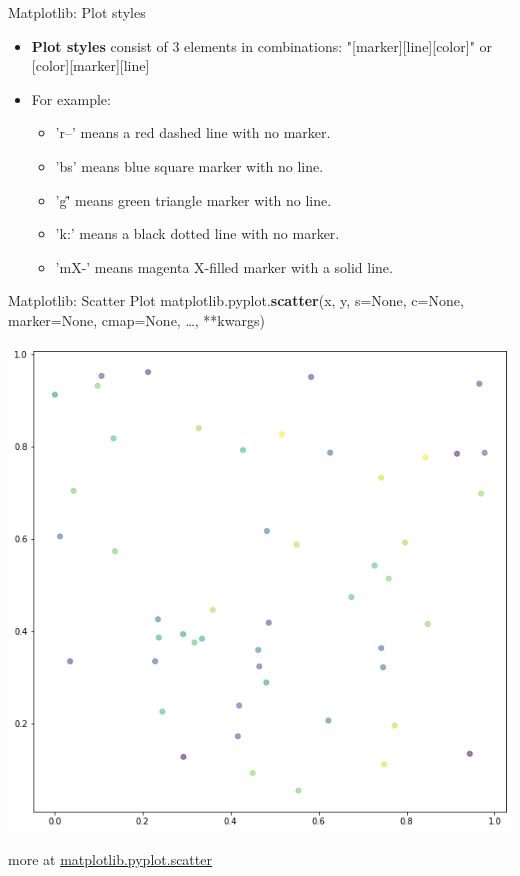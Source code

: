 \documentclass{beamer}
\begin{document}
\begin{frame}[fragile]{Matplotlib: Plot styles}
    \begin{itemize}
        \item \textbf{Plot styles} consist of 3 elements in combinations: "[marker][line][color]" or [color][marker][line]
        \item For example:
        \begin{itemize}
            \item 'r--' means a red dashed line with no marker.
            \item 'bs' means blue square marker with no line.
            \item 'g\^' means green triangle marker with no line.
            \item 'k:' means a black dotted line with no marker.
            \item 'mX-' means magenta X-filled marker with a solid line.
        \end{itemize}
    \end{itemize}
\end{frame}
\begin{frame}[fragile]{Matplotlib: Scatter Plot}
    matplotlib.pyplot.\textbf{scatter}(x, y, s=None, c=None, marker=None, cmap=None, \dots, **kwargs)\\
    \begin{center}
        \includegraphics[width=\textwidth,height=0.6\textheight,keepaspectratio]{figures/Scatter.png}\\
    \end{center}
    more at \href{https://matplotlib.org/stable/api/_as_gen/matplotlib.pyplot.scatter.html}{matplotlib.pyplot.scatter}
\end{frame}
\end{document}
